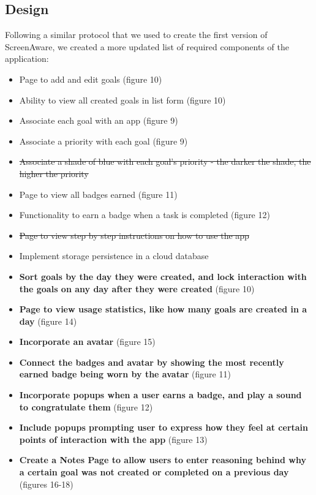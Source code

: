 \documentclass[12pt, title page, manuscript, nonacm]{acmart}
\begin{document}
\subsection*{Design}
Following a similar protocol that we used to create the first version of ScreenAware, we created a more updated list of required components of the application:
\begin{itemize}
    \item Page to add and edit goals (figure 10)
    \item Ability to view all created goals in list form (figure 10)
    \item Associate each goal with an app (figure 9)
    \item Associate a priority with each goal (figure 9)
    \item \sout{Associate a shade of blue with each goal's priority - the darker the shade, the higher the priority}
    \item Page to view all badges earned (figure 11)
    \item Functionality to earn a badge when a task is completed (figure 12)
    \item \sout{Page to view step by step instructions on how to use the app}
    \item Implement storage persistence in a cloud database
    \item \textbf{Sort goals by the day they were created, and lock interaction with the goals on any day after they were created} (figure 10)
    \item \textbf{Page to view usage statistics, like how many goals are created in a day} (figure 14)
    \item \textbf{Incorporate an avatar} (figure 15)
    \item \textbf{Connect the badges and avatar by showing the most recently earned badge being worn by the avatar} (figure 11)
    \item \textbf{Incorporate popups when a user earns a badge, and play a sound to congratulate them} (figure 12)
    \item \textbf{Include popups prompting user to express how they feel at certain points of interaction with the app} (figure 13)
    \item \textbf{Create a Notes Page to allow users to enter reasoning behind why a certain goal was not created or completed on a previous day} (figures 16-18)
\end{itemize}
\end{document}
